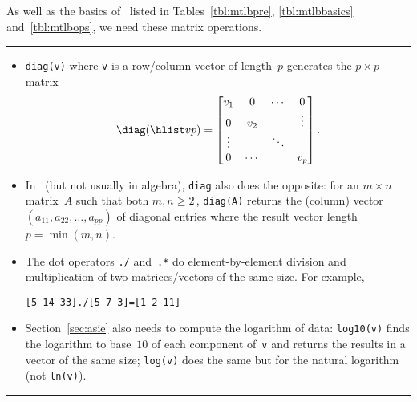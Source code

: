 \begin{table}
\caption{As well as the basics of \script\ listed in Tables~\ref{tbl:mtlbpre}, \ref{tbl:mtlbbasics} and~\ref{tbl:mtlbops},  we need these matrix operations.} \label{tbl:mtlbmops}
\hrule
\begin{minipage}{\linewidth}
\begin{itemize}
\item {}\verb|diag(v)| where \verb|v| is a row/column vector of length~\(p\) generates the \(p\times p\) matrix 
\begin{equation*}
\diag(\hlist vp)=\begin{bmatrix} v_1&0&\cdots&0\\
0&v_2&&\vdots\\ \vdots&&\ddots\\ 0&\cdots&&v_p \end{bmatrix}.
\end{equation*}

\item In \script\ (but not usually in algebra), \verb|diag| also does the opposite: for an \(m\times n\) matrix~\(A\) such that both \(m,n\geq2\)\,,  \verb|diag(A)| returns the (column) vector \((a_{11},a_{22},\ldots,a_{pp})\) of diagonal entries where the result vector length \(p=\min(m,n)\).

\item The dot operators \verb|./| and~\verb|.*| do element-by-element division and multiplication of two matrices\slash vectors of the same size.  For example, 
\begin{verbatim}
[5 14 33]./[5 7 3]=[1 2 11]
\end{verbatim}


\item Section~\ref{sec:asie} also needs to compute the logarithm of data: \verb|log10(v)| finds the logarithm to base~\(10\) of each component of~\verb|v| and returns the results in a vector of the same size; \verb|log(v)| does the same but for the natural logarithm (not \verb|ln(v)|).

\end{itemize}
\end{minipage}
\hrule
\end{table}




